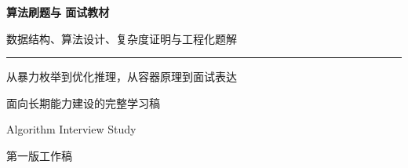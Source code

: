 \begin{titlepage}
\thispagestyle{empty}
\vspace*{2.2cm}
{\raggedright
{\fontsize{31}{40}\selectfont\bfseries 算法刷题与 \cpp 面试教材\par}
\vspace{0.72cm}
{\Large 数据结构、算法设计、复杂度证明与工程化题解\par}
\vspace{1.25cm}
{\color{BookRule}\rule{0.72\textwidth}{0.45pt}\par}
\vspace{1.1cm}
{\large 从暴力枚举到优化推理，从容器原理到面试表达\par}
\vspace{0.35cm}
{\large 面向长期能力建设的完整学习稿\par}
}
\vfill
\begin{flushright}
{\large Algorithm Interview Study\par}
\vspace{0.22cm}
{\color{BookMuted}第一版工作稿\par}
\end{flushright}
\end{titlepage}
